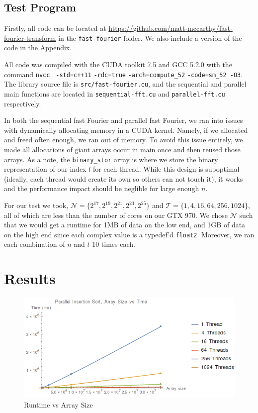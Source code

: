 \documentclass[notitlepage, twocolumn]{article}
\newcommand{\set}[1]{\lbrace #1 \rbrace}
\begin{document}
\subsection{Test Program}

Firstly, all code can be located at \url{https://github.com/matt-mccarthy/fast-fourier-transform} in the \verb|fast-fourier| folder.
We also include a version of the code in the Appendix.

All code was compiled with the CUDA toolkit 7.5 and GCC 5.2.0 with the command \verb|nvcc| \verb| -std=c++11| \verb|-rdc=true| \verb|-arch=compute_52| \verb|-code=sm_52 -O3|.
The library source file is \verb|src/fast-fourier.cu|, and the sequential and parallel main functions are located in \verb|sequential-fft.cu| and \verb|parallel-fft.cu| respectively.

In both the sequential fast Fourier and parallel fast Fourier, we ran into issues with dynamically allocating memory in a CUDA kernel.
Namely, if we allocated and freed often enough, we ran out of memory.
To avoid this issue entirely, we made all allocations of giant arrays occur in main once and then reused those arrays.
As a note, the \verb|binary_stor| array is where we store the binary representation of our index $l$ for each thread.
While this design is suboptimal (ideally, each thread would create its own so others can not touch it), it works and the performance impact should be neglible for large enough $n$.

For our test we took, $\mathcal{N}=\set{2^{17},2^{19},2^{21},2^{23},2^{25}}$ and $\mathcal{T}=\set{1,4,16,64,256,1024}$, all of which are less than the number of cores on our GTX 970.
We chose $\mathcal{N}$ such that we would get a runtime for 1MB of data on the low end, and 1GB of data on the high end since each complex value is a typedef'd \verb|float2|.
Moreover, we ran each combination of $n$ and $t$ 10 times each.

\section{Results}

\begin{figure}\label{results}
	\centering

	\includegraphics[scale=0.5]{results.png}
	\caption{Runtime vs Array Size}
\end{figure}
\end{document}
